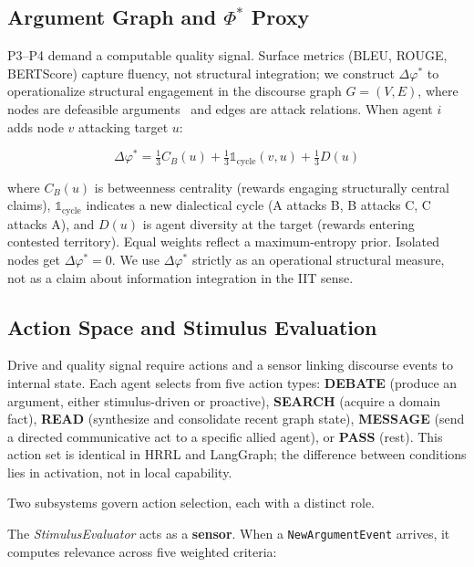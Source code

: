 \documentclass{llncs}
\begin{document}
\subsection{Argument Graph and $\Phi^*$ Proxy}

P3--P4 demand a computable quality signal.  Surface metrics (BLEU, ROUGE,
BERTScore) capture fluency, not structural integration; we construct
$\Delta\varphi^*$ to operationalize structural engagement in the discourse
graph $G=(V,E)$, where nodes are defeasible
arguments~\parencite{garcia2004defeasible} and edges are attack relations.
When agent $i$ adds node $v$ attacking target $u$:

\begin{equation}
    \Delta\varphi^* = \tfrac{1}{3} C_B(u) + \tfrac{1}{3}
        \mathbb{1}_{\text{cycle}}(v,u) + \tfrac{1}{3} D(u)
    \label{eq:phi}
\end{equation}

where $C_B(u)$ is betweenness centrality (rewards engaging structurally
central claims), $\mathbb{1}_{\text{cycle}}$ indicates a new dialectical
cycle (A attacks B, B attacks C, C attacks A), and $D(u)$ is agent diversity
at the target (rewards entering contested territory). Equal weights reflect a
maximum-entropy prior. Isolated nodes get $\Delta\varphi^* = 0$. We use
$\Delta\varphi^*$ strictly as an operational structural measure, not as a
claim about information integration in the IIT sense.

\subsection{Action Space and Stimulus Evaluation}

Drive and quality signal require actions and a sensor linking discourse
events to internal state.  Each agent selects from five action types: \textbf{DEBATE} (produce an
argument, either stimulus-driven or proactive), \textbf{SEARCH} (acquire a
domain fact), \textbf{READ} (synthesize and consolidate recent graph state),
\textbf{MESSAGE} (send a directed communicative act to a specific allied
agent), or \textbf{PASS} (rest). This action set is identical in HRRL and
LangGraph; the difference between conditions lies in activation, not in local
capability.

Two subsystems govern action selection, each with a distinct role.

The \emph{StimulusEvaluator} acts as a \textbf{sensor}. When a
\texttt{NewArgumentEvent} arrives, it computes relevance across five
weighted criteria:
\end{document}
